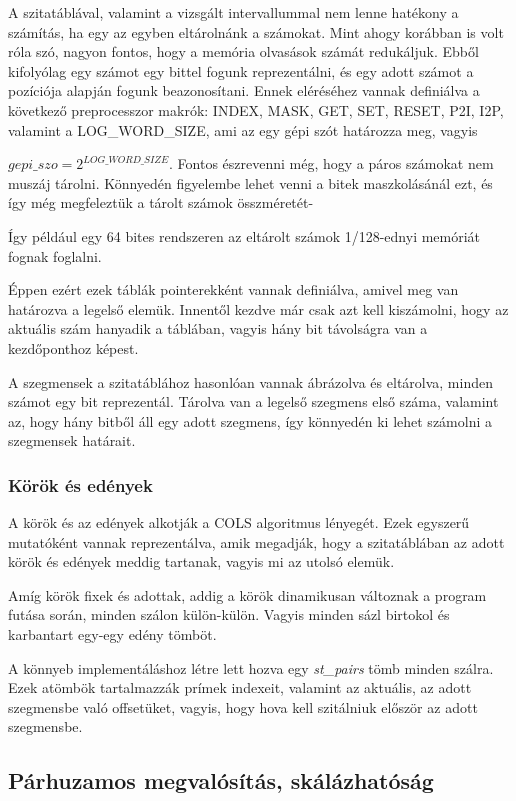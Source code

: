 \documentclass[twoside, a4paper, 12pt]{article}
\begin{document}
A szitatáblával, valamint a vizsgált intervallummal nem lenne hatékony a számítás, ha egy az egyben eltárolnánk a számokat. Mint ahogy korábban is volt róla szó, nagyon fontos, hogy a memória olvasások számát redukáljuk. Ebből kifolyólag egy számot egy bittel fogunk reprezentálni, és egy adott számot a pozíciója alapján fogunk beazonosítani. Ennek eléréséhez vannak definiálva a következő preprocesszor makrók: INDEX, MASK, GET, SET, RESET, P2I, I2P, valamint a LOG\_WORD\_SIZE, ami az egy gépi szót határozza meg, vagyis \par
\( gepi\_szo = 2^{LOG\_WORD\_SIZE} \). Fontos észrevenni még, hogy a páros számokat nem muszáj tárolni. Könnyedén figyelembe lehet venni a bitek maszkolásánál ezt, és így még megfeleztük a tárolt számok összméretét- \par
Így például egy 64 bites rendszeren az eltárolt számok 1/128-ednyi memóriát fognak foglalni. \par
Éppen ezért ezek táblák pointerekként vannak definiálva, amivel meg van határozva a legelső elemük. Innentől kezdve már csak azt kell kiszámolni, hogy az aktuális szám hanyadik a táblában, vagyis hány bit távolságra van a kezdőponthoz képest. \par
\bigskip
A szegmensek a szitatáblához hasonlóan vannak ábrázolva és eltárolva, minden számot egy bit reprezentál. Tárolva van a legelső szegmens első száma, valamint az, hogy hány bitből áll egy adott szegmens, így könnyedén ki lehet számolni a szegmensek határait.

\subsubsection{Körök és edények}

A körök és az edények alkotják a COLS algoritmus lényegét. Ezek egyszerű mutatóként vannak reprezentálva, amik megadják, hogy a szitatáblában az adott körök és edények meddig tartanak, vagyis mi az utolsó elemük. \par
Amíg körök fixek és adottak, addig a körök dinamikusan változnak a program futása során, minden szálon külön-külön. Vagyis minden sázl birtokol és karbantart egy-egy edény tömböt. \par
A könnyeb implementáláshoz létre lett hozva egy \textit{st\_pairs} tömb minden szálra. Ezek atömbök tartalmazzák prímek indexeit, valamint az aktuális, az adott szegmensbe való offsetüket, vagyis, hogy hova kell szitálniuk először az adott szegmensbe. 

\subsection{Párhuzamos megvalósítás, skálázhatóság} \label{scale}
\end{document}
